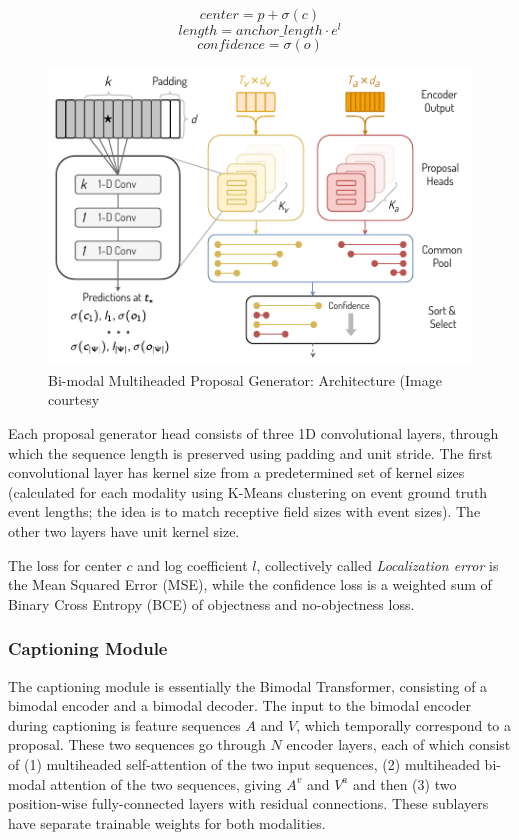 $$ center = p + \sigma(c) $$
$$ length = anchor\_length \cdot e^l $$
$$ confidence = \sigma(o) $$

\begin{figure}
	\centering
	\includegraphics[width=0.8\linewidth]{assets/img/bmt-proposal-generator}
	\caption{Bi-modal Multiheaded Proposal Generator: Architecture (Image courtesy \cite{iashin2020better}}
\end{figure}

\par
Each proposal generator head consists of three 1D convolutional layers, through which the 
sequence length is preserved using padding and unit stride. The first convolutional layer 
has kernel size from a predetermined set of kernel sizes (calculated for each modality using 
K-Means clustering on event ground truth event lengths; the idea is to match receptive field 
sizes with event sizes). The other two layers have unit kernel size.\par

The loss for center $c$ and log coefficient $l$, collectively called \textit{Localization 
error} is the Mean Squared Error (MSE), while the confidence loss is a weighted sum of 
Binary Cross Entropy (BCE) of objectness and no-objectness loss. \par


\subsubsection{Captioning Module}
\par
The captioning module is essentially the Bimodal Transformer, consisting of a bimodal 
encoder and a bimodal decoder. The input to the bimodal encoder during captioning is feature 
sequences $A$ and $V$, which temporally correspond to a proposal. These two sequences go 
through $N$ encoder layers, each of which consist of (1) multiheaded self-attention of the 
two input sequences, (2) multiheaded bi-modal attention of the two sequences, giving $A^v$ 
and $V^a$ and then (3) two position-wise fully-connected layers with residual connections. 
These sublayers have separate trainable weights for both modalities.\par

